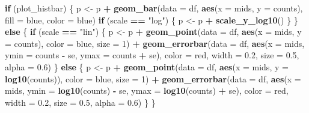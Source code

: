 \documentclass[
]{article}
\newenvironment{Shaded}{\begin{snugshade}}{\end{snugshade}}
\newcommand{\AttributeTok}[1]{\textcolor[rgb]{0.13,0.29,0.53}{#1}}
\newcommand{\ControlFlowTok}[1]{\textcolor[rgb]{0.13,0.29,0.53}{\textbf{#1}}}
\newcommand{\DecValTok}[1]{\textcolor[rgb]{0.00,0.00,0.81}{#1}}
\newcommand{\FloatTok}[1]{\textcolor[rgb]{0.00,0.00,0.81}{#1}}
\newcommand{\FunctionTok}[1]{\textcolor[rgb]{0.13,0.29,0.53}{\textbf{#1}}}
\newcommand{\NormalTok}[1]{#1}
\newcommand{\OtherTok}[1]{\textcolor[rgb]{0.56,0.35,0.01}{#1}}
\newcommand{\SpecialCharTok}[1]{\textcolor[rgb]{0.81,0.36,0.00}{\textbf{#1}}}
\newcommand{\StringTok}[1]{\textcolor[rgb]{0.31,0.60,0.02}{#1}}
\begin{document}
\begin{Shaded}
\begin{Highlighting}[]
  \ControlFlowTok{if}\NormalTok{ (plot\_histbar) \{}
\NormalTok{    p }\OtherTok{\textless{}{-}}\NormalTok{ p }\SpecialCharTok{+} \FunctionTok{geom\_bar}\NormalTok{(}\AttributeTok{data =}\NormalTok{ df, }\FunctionTok{aes}\NormalTok{(}\AttributeTok{x =}\NormalTok{ mids, }\AttributeTok{y =}\NormalTok{ counts), }\AttributeTok{fill =} \StringTok{\textquotesingle{}blue\textquotesingle{}}\NormalTok{, }\AttributeTok{color =} \StringTok{\textquotesingle{}blue\textquotesingle{}}\NormalTok{)}
    \ControlFlowTok{if}\NormalTok{ (scale }\SpecialCharTok{==} \StringTok{"log"}\NormalTok{) \{}
\NormalTok{      p }\OtherTok{\textless{}{-}}\NormalTok{ p }\SpecialCharTok{+} \FunctionTok{scale\_y\_log10}\NormalTok{()}
\NormalTok{    \}}
\NormalTok{  \} }\ControlFlowTok{else}\NormalTok{ \{}
    \ControlFlowTok{if}\NormalTok{ (scale }\SpecialCharTok{==} \StringTok{"lin"}\NormalTok{) \{}
\NormalTok{      p }\OtherTok{\textless{}{-}}\NormalTok{ p }\SpecialCharTok{+}
        \FunctionTok{geom\_point}\NormalTok{(}\AttributeTok{data =}\NormalTok{ df, }\FunctionTok{aes}\NormalTok{(}\AttributeTok{x =}\NormalTok{ mids, }\AttributeTok{y =}\NormalTok{ counts), }\AttributeTok{color =} \StringTok{\textquotesingle{}blue\textquotesingle{}}\NormalTok{, }\AttributeTok{size =} \DecValTok{1}\NormalTok{) }\SpecialCharTok{+}
        \FunctionTok{geom\_errorbar}\NormalTok{(}\AttributeTok{data =}\NormalTok{ df, }\FunctionTok{aes}\NormalTok{(}\AttributeTok{x =}\NormalTok{ mids, }\AttributeTok{ymin =}\NormalTok{ counts }\SpecialCharTok{{-}}\NormalTok{ se, }\AttributeTok{ymax =}\NormalTok{ counts }\SpecialCharTok{+}\NormalTok{ se), }\AttributeTok{color =} \StringTok{\textquotesingle{}red\textquotesingle{}}\NormalTok{, }\AttributeTok{width =} \FloatTok{0.2}\NormalTok{, }\AttributeTok{size =} \FloatTok{0.5}\NormalTok{, }\AttributeTok{alpha =} \FloatTok{0.6}\NormalTok{)}
\NormalTok{    \} }\ControlFlowTok{else}\NormalTok{ \{}
\NormalTok{      p }\OtherTok{\textless{}{-}}\NormalTok{ p }\SpecialCharTok{+}
        \FunctionTok{geom\_point}\NormalTok{(}\AttributeTok{data =}\NormalTok{ df, }\FunctionTok{aes}\NormalTok{(}\AttributeTok{x =}\NormalTok{ mids, }\AttributeTok{y =} \FunctionTok{log10}\NormalTok{(counts)), }\AttributeTok{color =} \StringTok{\textquotesingle{}blue\textquotesingle{}}\NormalTok{, }\AttributeTok{size =} \DecValTok{1}\NormalTok{) }\SpecialCharTok{+}
        \FunctionTok{geom\_errorbar}\NormalTok{(}\AttributeTok{data =}\NormalTok{ df, }\FunctionTok{aes}\NormalTok{(}\AttributeTok{x =}\NormalTok{ mids, }\AttributeTok{ymin =} \FunctionTok{log10}\NormalTok{(counts) }\SpecialCharTok{{-}}\NormalTok{ se, }\AttributeTok{ymax =} \FunctionTok{log10}\NormalTok{(counts) }\SpecialCharTok{+}\NormalTok{ se), }\AttributeTok{color =} \StringTok{\textquotesingle{}red\textquotesingle{}}\NormalTok{, }\AttributeTok{width =} \FloatTok{0.2}\NormalTok{, }\AttributeTok{size =} \FloatTok{0.5}\NormalTok{, }\AttributeTok{alpha =} \FloatTok{0.6}\NormalTok{)}
\NormalTok{    \}}
\NormalTok{  \}}


\end{Highlighting}
\end{Shaded}
\end{document}

